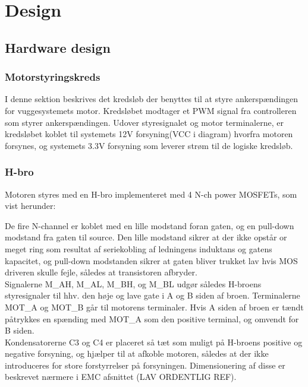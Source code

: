 \section{Design}
\subsection{Hardware design}

\subsubsection{Motorstyringskreds}
I denne sektion beskrives det kredsløb der benyttes til at styre ankerspændingen for vuggesystemets motor. Kredsløbet modtager et PWM signal fra controlleren som styrer ankerspændingen. Udover styresignalet og motor terminalerne, er kredsløbet koblet til systemets 12V forsyning(VCC i diagram) hvorfra motoren forsynes, og systemets 3.3V forsyning som leverer strøm til de logiske kredsløb.\\


\subsubsection*{H-bro}
\label{Vuggesytem:HW_DESIGN_HBRO} 
Motoren styres med en H-bro implementeret med 4 N-ch power MOSFETs, som vist herunder:


De fire N-channel er koblet med en lille modstand foran gaten, og en pull-down modstand fra gaten til source. Den lille modstand sikrer at der ikke opstår or meget ring som resultat af seriekobling af ledningens induktans og gatens kapacitet, og pull-down modstanden sikrer at gaten bliver trukket lav hvis MOS driveren skulle fejle, således at transistoren afbryder. \\ 
Signalerne M\_AH, M\_AL, M\_BH, og M\_BL udgør således H-broens styresignaler til hhv. den høje og lave gate i A og B siden af broen. Terminalerne MOT\_A og MOT\_B går til motorens terminaler. Hvis A siden af broen er tændt påtrykkes en spænding med MOT\_A som den positive terminal, og omvendt for B siden. \\
Kondensatorerne C3 og C4 er placeret så tæt som muligt på H-broens positive og negative forsyning, og hjælper til at afkoble motoren, således at der ikke introduceres for store forstyrrelser på forsyningen. Dimensionering af disse er beskrevet nærmere i EMC afsnittet (LAV ORDENTLIG REF).\\

